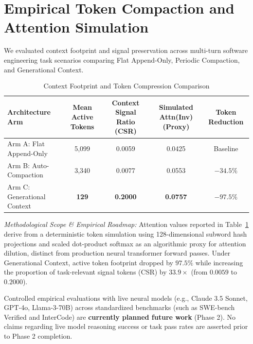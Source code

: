 \documentclass[11pt,a4paper]{article}
\begin{document}
\section{Empirical Token Compaction and Attention Simulation}
\label{sec:experiments}

We evaluated context footprint and signal preservation across multi-turn software engineering task scenarios comparing Flat Append-Only, Periodic Compaction, and Generational Context.

\begin{table}[ht]
\centering
\caption{Context Footprint and Token Compression Comparison}
\label{tab:compaction_results}
\begin{tabular}{lcccc}
\toprule
\textbf{Architecture Arm} & \textbf{Mean Active Tokens} & \textbf{Context Signal Ratio (CSR)} & \textbf{Simulated Attn(Inv) (Proxy)} & \textbf{Token Reduction} \\
\midrule
Arm A: Flat Append-Only & 5,099 & 0.0059 & 0.0425 & Baseline \\
Arm B: Auto-Compaction & 3,340 & 0.0077 & 0.0553 & $-34.5\%$ \\
Arm C: Generational Context & \textbf{129} & \textbf{0.2000} & \textbf{0.0757} & \textbf{$-97.5\%$} \\
\bottomrule
\end{tabular}
\end{table}

\noindent\textit{Methodological Scope \& Empirical Roadmap:} 
Attention values reported in Table~\ref{tab:compaction_results} derive from a deterministic token simulation using 128-dimensional subword hash projections and scaled dot-product softmax as an algorithmic proxy for attention dilution, distinct from production neural transformer forward passes. Under Generational Context, active token footprint dropped by $97.5\%$ while increasing the proportion of task-relevant signal tokens (CSR) by $33.9\times$ (from $0.0059$ to $0.2000$).

Controlled empirical evaluations with live neural models (e.g., Claude 3.5 Sonnet, GPT-4o, Llama-3-70B) across standardized benchmarks (such as SWE-bench Verified and InterCode) are \textbf{currently planned future work} (Phase 2). No claims regarding live model reasoning success or task pass rates are asserted prior to Phase 2 completion.
\end{document}
